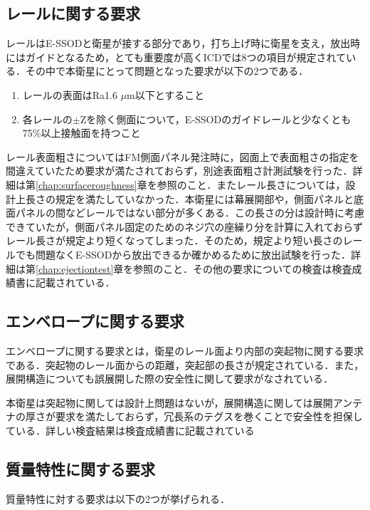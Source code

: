 \subsection{レールに関する要求}

レールはE-SSODと衛星が接する部分であり，打ち上げ時に衛星を支え，放出時にはガイドとなるため，とても重要度が高くICDでは8つの項目が規定されている．その中で本衛星にとって問題となった要求が以下の2つである．

\begin{enumerate}
	\item レールの表面はRa1.6 $\mu$m以下とすること
	\item 各レールの$\pm$Zを除く側面について，E-SSODのガイドレールと少なくとも75\%以上接触面を持つこと
\end{enumerate}

レール表面粗さについてはFM側面パネル発注時に，図面上で表面粗さの指定を間違えていたため要求が満たされておらず，別途表面粗さ計測試験を行った．詳細は第\ref{chap:surfaceroughness}章を参照のこと．またレール長さについては，設計上長さの規定を満たしていなかった．本衛星には幕展開部や，側面パネルと底面パネルの間などレールではない部分が多くある．この長さの分は設計時に考慮できていたが，側面パネル固定のためのネジ穴の座繰り分を計算に入れておらずレール長さが規定より短くなってしまった．そのため，規定より短い長さのレールでも問題なくE-SSODから放出できるか確かめるために放出試験を行った．詳細は第\ref{chap:ejectiontest}章を参照のこと．その他の要求についての検査は検査成績書に記載されている．

\subsection{エンベロープに関する要求}

エンベロープに関する要求とは，衛星のレール面より内部の突起物に関する要求である．突起物のレール面からの距離，突起部の長さが規定されている．また，展開構造についても誤展開した際の安全性に関して要求がなされている．

本衛星は突起物に関しては設計上問題はないが，展開構造に関しては展開アンテナの厚さが要求を満たしておらず，冗長系のテグスを巻くことで安全性を担保している．詳しい検査結果は検査成績書に記載されている

\subsection{質量特性に関する要求}

質量特性に対する要求は以下の2つが挙げられる．

